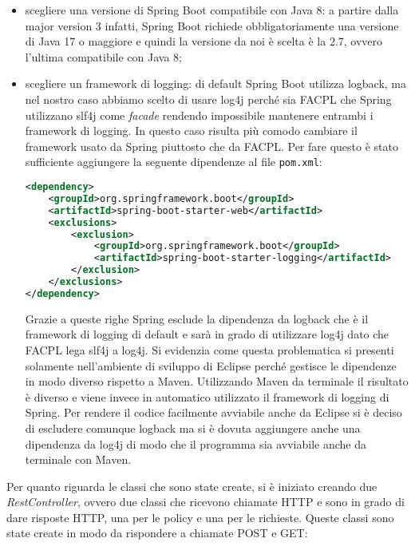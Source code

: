 \begin{itemize}
    \item scegliere una versione di Spring Boot compatibile con Java 8: a partire dalla major version 3 infatti, Spring Boot richiede obbligatoriamente una versione di Java 17 o maggiore e quindi la versione da noi è scelta è la 2.7, ovvero l'ultima compatibile con Java 8;
    \item scegliere un framework di logging: di default Spring Boot utilizza logback, ma nel nostro caso abbiamo scelto di usare log4j perché sia FACPL che Spring utilizzano slf4j come \emph{facade} rendendo impossibile mantenere entrambi i framework di logging. In questo caso risulta più comodo cambiare il framework usato da Spring piuttosto che da FACPL. Per fare questo è stato sufficiente aggiungere la seguente dipendenze al file \texttt{pom.xml}:
    \begin{lstlisting}[language=XML, xleftmargin=1em, caption=Esclusione di logback, label=code:noLogback]
<dependency>
    <groupId>org.springframework.boot</groupId>
    <artifactId>spring-boot-starter-web</artifactId>
    <exclusions>
        <exclusion>
            <groupId>org.springframework.boot</groupId>
            <artifactId>spring-boot-starter-logging</artifactId>
        </exclusion>
    </exclusions>
</dependency>
    \end{lstlisting}
    Grazie a queste righe Spring esclude la dipendenza da logback che è il framework di logging di default e sarà in grado di utilizzare log4j dato che FACPL lega slf4j a log4j. Si evidenzia come questa problematica si presenti solamente nell'ambiente di sviluppo di Eclipse perché gestisce le dipendenze in modo diverso rispetto a Maven. Utilizzando Maven da terminale il risultato è diverso e viene invece in automatico utilizzato il framework di logging di Spring. Per rendere il codice facilmente avviabile anche da Eclipse si è deciso di escludere comunque logback ma si è dovuta aggiungere anche una dipendenza da log4j di modo che il programma sia avviabile anche da terminale con Maven.
\end{itemize}
Per quanto riguarda le classi che sono state create, si è iniziato creando due \emph{RestController}, ovvero due classi che ricevono chiamate HTTP e sono in grado di dare risposte HTTP, una per le policy e una per le richieste. Queste classi sono state create in modo da rispondere a chiamate POST e GET:
